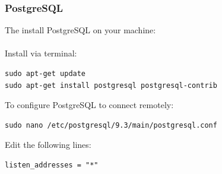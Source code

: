 \documentclass[11pt,a4paper]{article}
\begin{document}

\subsubsection{PostgreSQL}
The install PostgreSQL on your machine: \\\\
Install via terminal:
\begin{lstlisting}
sudo apt-get update
sudo apt-get install postgresql postgresql-contrib
\end{lstlisting}
To configure PostgreSQL to connect remotely:
\begin{lstlisting}
sudo nano /etc/postgresql/9.3/main/postgresql.conf
\end{lstlisting}
Edit the following lines:
\begin{lstlisting}
listen_addresses = "*"
\end{lstlisting}
\pagebreak
\end{document}
